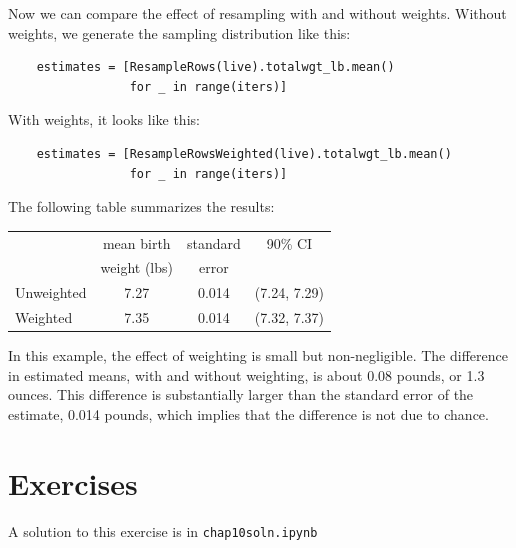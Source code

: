 \documentclass[12pt]{book}
\theoremstyle{exercise}
\begin{document}
Now we can compare the effect of resampling with and without
weights.  Without weights, we generate the sampling distribution
like this:%

\begin{verbatim}
    estimates = [ResampleRows(live).totalwgt_lb.mean()
                 for _ in range(iters)]
\end{verbatim}

With weights, it looks like this:

\begin{verbatim}
    estimates = [ResampleRowsWeighted(live).totalwgt_lb.mean()
                 for _ in range(iters)]
\end{verbatim}

The following table summarizes the results:

\begin{center}
\begin{tabular}{|l|c|c|c|}
\hline
                    &  mean birth   & standard  &  90\% CI  \\ 
                    &  weight (lbs) & error     &           \\ 
\hline
Unweighted          &  7.27  &  0.014  &  (7.24, 7.29)  \\ 
Weighted            &  7.35  &  0.014  &  (7.32, 7.37)  \\ 
\hline
\end{tabular}
\end{center}


In this example, the effect of weighting is small but non-negligible.
The difference in estimated means, with and without weighting, is
about 0.08 pounds, or 1.3 ounces.  This difference is substantially
larger than the standard error of the estimate, 0.014 pounds, which
implies that the difference is not due to chance.%
%


\section{Exercises}

A solution to this exercise is in \verb"chap10soln.ipynb"
\end{document}
